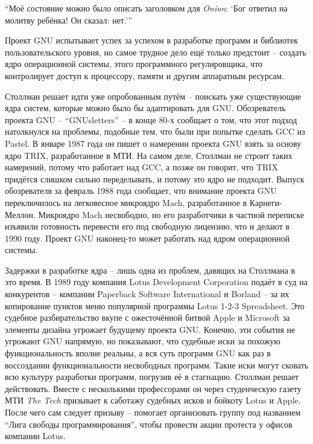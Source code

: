 \enquote{Моё состояние можно было описать заголовком для \textit{Onion}: \hspace{0.01in}\enquote{Бог ответил на молитву ребёнка! Он сказал: нет.}\hspace{0.01in}}

Проект GNU испытывает успех за успехом в разработке программ и библиотек пользовательского уровня, но самое трудное дело ещё только предстоит -- создать ядро операционной системы, этого программного регулировщика, что контролирует доступ к процессору, памяти и другим аппаратным ресурсам.

Столлман решает идти уже опробованным путём -- поискать уже существующие ядра систем, которые можно было бы адаптировать для GNU. Обозреватель проекта GNU -- \enquote{GNUsletters} -- в конце 80-х сообщает о том, что этот подход натолкнулся на проблемы, подобные тем, что были при попытке сделать GCC из Pastel. В январе 1987 года он пишет о намерении проекта GNU взять за основу ядро TRIX, разработанное в МТИ. На самом деле, Столлман не строит таких намерений, потому что работает над GCC, а позже он говорит, что TRIX придётся слишком сильно переделывать, и потому это ядро не подходит. Выпуск обозревателя за февраль 1988 года сообщает, что внимание проекта GNU переключилось на легковесное микроядро Mach, разработанное в Карнеги-Меллон. Микроядро Mach несвободно, но его разработчики в частной переписке изъявили готовность перевести его под свободную лицензию, что и делают в 1990 году. Проект GNU наконец-то может работать над ядром операционной системы. 

Задержки в разработке ядра -- лишь одна из проблем, давящих на Столлмана в это время. В 1989 году компания Lotus Development Corporation подаёт в суд на конкурентов -- компании Paperback Software International и Borland -- за их копирование пунктов меню популярной программы Lotus 1-2-3 Spreadsheet. Это судебное разбирательство вкупе с ожесточённой битвой Apple и Microsoft за элементы дизайна угрожает будущему проекта GNU. Конечно, эти события не угрожают GNU напрямую, но показывают, что судебные иски за похожую функциональность вполне реальны, а вся суть программ GNU как раз в воссоздании функциональности несвободных программ. Такие иски могут сковать всю культуру разработки программ, погрузив её в стагнацию. Столлман решает действовать. Вместе с несколькими профессорами он через студенческую газету МТИ \textit{The Tech} призывает к саботажу судебных исков и бойкоту Lotus и Apple. После чего сам следует призыву -- помогает организовать группу под названием \enquote{Лига свободы программирования}, чтобы провести акции протеста у офисов компании Lotus.

